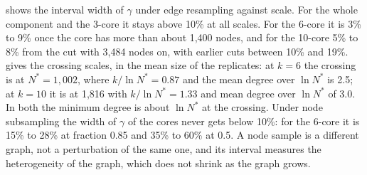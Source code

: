 \documentclass[11pt]{article}
\begin{document}
 shows the interval width of $\gamma$ under edge resampling against scale. For the
whole component and the 3-core it stays above 10\% at all scales. For the 6-core it is 3\% to 9\%
once the core has more than about 1,400 nodes, and for the 10-core 5\% to 8\% from the cut with
3,484 nodes on, with earlier cuts between 10\% and 19\%.  gives the crossing
scales, in the mean size of the replicates: at $k=6$ the crossing is at $N^* = 1{,}002$,
where $k/\ln N^* = 0.87$ and the mean degree over $\ln N^*$ is 2.5; at $k = 10$ it is at 1,816 with
$k/\ln N^* = 1.33$ and mean degree over $\ln N^*$ of 3.0. In both the minimum degree is about
$\ln N^*$ at the crossing. Under node subsampling the width of $\gamma$ of the cores never gets
below 10\%: for the 6-core it is 15\% to 28\% at fraction 0.85 and 35\% to 60\% at 0.5. A node sample
is a different graph, not a perturbation of the same one, and its interval measures the
heterogeneity of the graph, which does not shrink as the graph grows.
\end{document}
